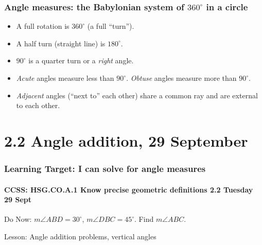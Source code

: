 \documentclass{beamer}
\begin{document}
\frame
{
  \frametitle{Angle measures: the Babylonian system of $360^\circ$ in a circle}
    \begin{itemize}
      \item A full rotation is $360^\circ$ (a full ``turn'').
      \item A half turn (straight line) is $180^\circ$.
      \item $90^\circ$ is a quarter turn or a \emph{right} angle.
      \item \emph{Acute} angles measure less than $90^\circ$. \emph{Obtuse} angles measure more than $90^\circ$.
      \item \emph{Adjacent} angles (``next to'' each other) share a common ray and are external to each other.
    \end{itemize}
  \begin{center}
    \end{center}
}

\section{2.2 Angle addition, 29 September}
\frame
{
  \frametitle{Learning Target: I can solve for angle measures}
  \framesubtitle{CCSS: HSG.CO.A.1 Know precise geometric definitions  \hfill \alert{2.2 Tuesday 29 Sept}}

  \begin{block}{Do Now: $m\angle ABD=30^\circ$, $m\angle DBC=45^\circ$. Find $m\angle ABC$.}\vspace{0.5cm}
          \begin{center}
            \end{center}
  \end{block}
  Lesson: Angle addition problems, vertical angles
}
\end{document}
